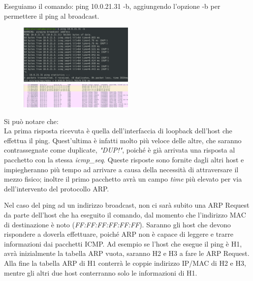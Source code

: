 \documentclass{article}
\begin{document}
\begin{flushleft}
  Eseguiamo il comando: ping 10.0.21.31 -b, aggiungendo l’opzione -b per permettere il ping al broadcast.
\end{flushleft}

\begin{figure} %
    \centering
    \includegraphics[width=0.5\textwidth]{broadcast1.png}
    \includegraphics[width=0.5\textwidth]{wiresharkbroadcast.png}
\end{figure}

Si può notare che: \\
La prima risposta ricevuta è quella dell’interfaccia di loopback dell’host che effettua il ping. 
Quest'ultima è infatti molto più veloce delle altre, che saranno contrassegnate come duplicate, \textit{"DUP!"}, poiché è già arrivata una risposta al pacchetto con la stessa \textit{icmp\_seq}. 
Queste risposte sono fornite dagli altri host e impiegheranno più tempo ad arrivare a causa della necessità di attraversare il mezzo fisico; 
inoltre il primo pacchetto avrà un campo \textit{time} più elevato per via dell'intervento del protocollo ARP.


Nel caso del ping ad un indirizzo  broadcast, non ci sarà subito una ARP Request da parte dell’host che ha eseguito il comando, dal momento che l’indirizzo MAC di destinazione è noto (\textit{FF:FF:FF:FF:FF:FF}).
Saranno gli host che devono rispondere a doverla effettuare, poiché ARP non è capace di leggere e trarre informazioni dai pacchetti ICMP.
Ad esempio se l’host che esegue il ping è H1, avrà inizialmente la tabella ARP vuota, saranno H2 e H3 a fare le ARP Request. 
Alla fine la tabella ARP di H1 conterrà le coppie indirizzo IP/MAC di H2 e H3, mentre gli altri due host conterranno solo le informazioni di H1.
\end{document}

